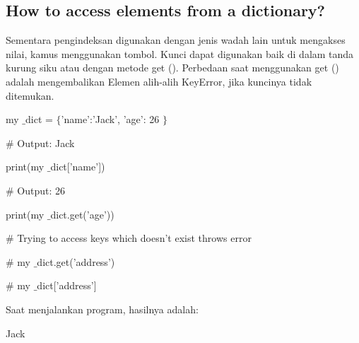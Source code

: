 \subsection*{How to access elements from a dictionary?}
 \par
\noindent 
Sementara pengindeksan digunakan dengan jenis wadah lain untuk mengakses nilai, kamus menggunakan tombol. Kunci dapat digunakan baik di dalam tanda kurung siku atau dengan metode get (). Perbedaan saat menggunakan get () adalah mengembalikan Elemen alih-alih KeyError, jika kuncinya tidak ditemukan. \par
\noindent 
 \hspace*{0.5in} my $  \_  $dict =  $  \{  $'name':'Jack', 'age': 26 $  \}  $ \par
\noindent 
 \hspace*{0.5in}  $  \#  $ Output: Jack \par
\noindent 
 \hspace*{0.5in} print(my $  \_  $dict['name']) \par
\noindent 
 \hspace*{0.5in}  $  \#  $ Output: 26 \par
\noindent 
 \hspace*{0.5in} print(my $  \_  $dict.get('age')) \par
\noindent 
 \hspace*{0.5in}  $  \#  $ Trying to access keys which doesn't exist throws error \par
\noindent 
 \hspace*{0.5in}  $  \#  $ my $  \_  $dict.get('address') \par
\noindent 
 \hspace*{0.5in}  $  \#  $ my $  \_  $dict['address'] \par
\noindent 
Saat menjalankan program, hasilnya adalah: \par
\noindent 
{\fontsize{11pt}{11pt}\selectfont Jack} \par
\noindent 
{\fontsize{11pt}{11pt}} \par
\vspace{12pt}
\noindent 
